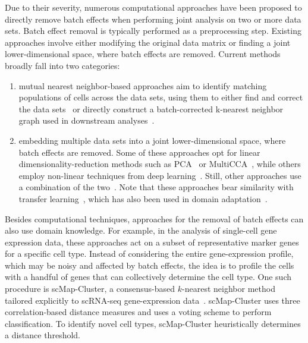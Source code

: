 \documentclass[runningheads]{llncs}
\begin{document}
Due to their severity, numerous computational approaches have been proposed to
directly remove batch effects when performing joint analysis on two or more
data sets. Batch effect removal is typically performed as a preprocessing
step. Existing approaches involve either modifying the original data matrix
or finding a joint lower-dimensional space, where batch effects are removed.
Current methods broadly fall into two categories:
\begin{enumerate}
\item mutual nearest neighbor-based approaches aim to identify matching
 populations of cells across the data sets, using them to either find and
 correct the data sets~\cite{Haghverdi2018} or directly construct a
 batch-corrected k-nearest neighbor graph used in downstream analyses~\cite
 {Park2018}.
\item embedding multiple data sets into a joint lower-dimensional space, where
 batch effects are removed. Some of these approaches opt for linear
 dimensionality-reduction methods such as PCA~\cite{Korsunsky2019} or
 MultiCCA~\cite{Butler2018}, while others employ non-linear techniques from
 deep learning~\cite{Li2020,Lopez2018}. Still, other approaches use a
 combination of the two~\cite{Stuart2019,Hie2019}. Note that these approaches bear similarity with transfer learning~\cite{https://journalofbigdata.springeropen.com/articles/10.1186/s40537-016-0043-6}, which has also been used in domain adaptation~\cite{https://jieliu6.github.io/publication/conference-paper/jointly-embedding-multiple-single-cell/}.
\end{enumerate}

Besides computational techniques, approaches for the removal of batch effects
can also use domain knowledge. For example, in the analysis of single-cell
gene expression data, these approaches act on a subset of representative
marker genes for a specific cell type. Instead of considering the entire
gene-expression profile, which may be noisy and affected by batch effects,
the idea is to profile the cells with a handful of genes that can
collectively determine the cell type. One such procedure is scMap-Cluster, a
consensus-based $k$-nearest neighbor method tailored explicitly to scRNA-seq
gene-expression data~\cite{Kiselev2018}. scMap-Cluster uses three
correlation-based distance measures and uses a voting scheme to perform
classification. To identify novel cell types, scMap-Cluster heuristically
determines a distance threshold.
\end{document}
